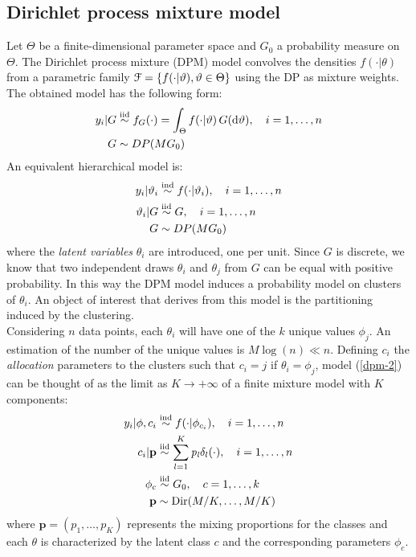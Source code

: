\subsection{Dirichlet process mixture model}
Let $\Theta$ be a finite-dimensional parameter space and $G_0$ a probability measure on $\Theta$.
The Dirichlet process mixture (DPM) model convolves the densities $f(\cdot|\theta)$ from a parametric family $\mathcal F = \{f(\cdot|\vartheta), \vartheta \in \Theta \}$ using the DP as mixture weights.
The obtained model has the following form:
\begin{equation}
	\begin{aligned}\label{dpm-1}
	y_i | G &\stackrel{\text{iid}}{\sim} f_G(\cdot) = \int_\Theta f(\cdot|\vartheta) \, G(\mathrm d\vartheta), \quad i=1,\dots,n \\
	G &\sim DP(M G_0)
	\end{aligned}
\end{equation}
An equivalent hierarchical model is:
\begin{equation}
	\begin{aligned}\label{dpm-2}
	y_i | \vartheta_i &\stackrel{\text{ind}}{\sim} f(\cdot|\vartheta_i), \quad i=1,\dots,n \\
	\vartheta_i | G &\stackrel{\text{iid}}{\sim} G, \quad i=1,\dots,n \\ 
	G &\sim DP(M G_0)
	\end{aligned}
\end{equation}
where the \emph{latent variables} $\theta_i$ are introduced, one per unit.
Since $G$ is discrete, we know that two independent draws $\theta_i$ and $\theta_j$ from $G$ can be equal with positive probability.
In this way the DPM model induces a probability model on clusters of $\theta_i$.
An object of interest that derives from this model is the partitioning induced by the clustering. \\%
Considering $n$ data points, each $\theta_i$ will have one of the $k$ unique values $\phi_{j}$.
An estimation of the number of the unique values is $M\log(n) \ll n$.
Defining  $c_i$ the \emph{allocation} parameters to the clusters such that $c_i = j$ if $\theta_i = \phi_j$, model (\ref{dpm-2}) can be thought of as the limit as $K \to +\infty$  of a finite mixture model with $K$ components:
\begin{equation}
	\begin{aligned}\label{dpm-disc}
		y_{i}|\mathbf{\phi},c_{i} &\stackrel{\text{ind}}{\sim} f(\cdot|\phi_{c_{i}}), \quad i=1,\dots,n \\
		c_{i}|\mathit{\mathbf{p}}&\stackrel{\text{iid}}{\sim} \sum_{l=1}^K\mathit{p_l} \delta_l(\cdot), \quad i=1,\dots,n \\
		\phi_{c} & \stackrel{\text{iid}}{\sim} G_{0}, \quad c=1,\dots,k \\
		\mathbf{p} &\sim \operatorname{Dir}(M/K,\dots,M/K)
	\end{aligned}
\end{equation}
where $\mathbf{p}=(p_1,\dots,p_K)$ represents the mixing proportions for the classes and each $\theta$ is characterized by the latent class $c$ and the corresponding parameters $\phi_c$.

